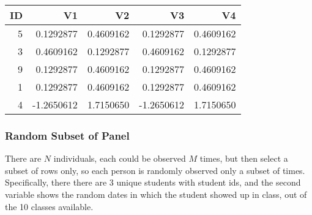 \documentclass[
]{book}
\newenvironment{Shaded}{\begin{snugshade}}{\end{snugshade}}
\newcommand{\KeywordTok}[1]{\textcolor[rgb]{0.13,0.29,0.53}{\textbf{#1}}}
\newcommand{\NormalTok}[1]{#1}
\newcommand{\OperatorTok}[1]{\textcolor[rgb]{0.81,0.36,0.00}{\textbf{#1}}}
\newcommand{\StringTok}[1]{\textcolor[rgb]{0.31,0.60,0.02}{#1}}
\begin{document}
\begin{Shaded}
\end{Shaded}

\begin{table}[!h]
\centering
\begin{tabular}{r|r|r|r|r}
\hline
ID & V1 & V2 & V3 & V4\\
\hline
\rowcolor{gray!6}  5 & 0.1292877 & 0.4609162 & 0.1292877 & 0.4609162\\
\hline
3 & 0.4609162 & 0.1292877 & 0.4609162 & 0.1292877\\
\hline
\rowcolor{gray!6}  9 & 0.1292877 & 0.4609162 & 0.1292877 & 0.4609162\\
\hline
1 & 0.1292877 & 0.4609162 & 0.1292877 & 0.4609162\\
\hline
\rowcolor{gray!6}  4 & -1.2650612 & 1.7150650 & -1.2650612 & 1.7150650\\
\hline
\end{tabular}
\end{table}

\hypertarget{random-subset-of-panel}{%
\subsubsection{Random Subset of Panel}\label{random-subset-of-panel}}

There are \(N\) individuals, each could be observed \(M\) times, but then select a subset of rows only, so each person is randomly observed only a subset of times. Specifically, there there are 3 unique students with student ids, and the second variable shows the random dates in which the student showed up in class, out of the 10 classes available.
\end{document}
